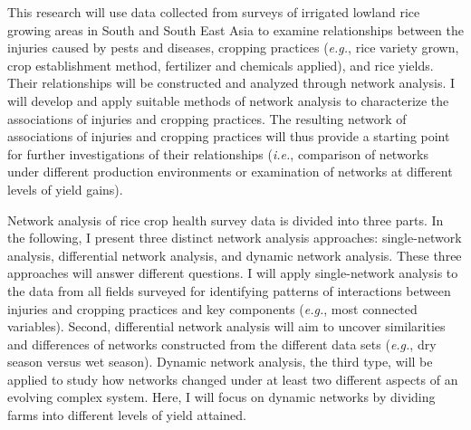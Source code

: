 


This research will use data collected from surveys of irrigated lowland rice growing areas in South and South East Asia to examine relationships between the injuries caused by pests and diseases, cropping practices (\textit{\textit{e.g.}}, rice variety grown, crop establishment method, fertilizer and chemicals applied), and rice yields. Their relationships will be constructed and analyzed through network analysis. I will develop and apply suitable methods of network analysis to characterize the associations of injuries and cropping practices. The resulting network of associations of injuries and cropping practices will thus provide a starting point for further investigations of their relationships (\textit{i.e.}, comparison of networks under different production environments or examination of networks at different levels of yield gains). 

Network analysis of rice crop health survey data is divided into three parts. In the following, I present three distinct network analysis approaches: single-network analysis, differential network analysis, and dynamic network analysis. These three approaches will answer different questions. I will apply single-network analysis to the data from all fields surveyed for identifying patterns of interactions between injuries and cropping practices and key components (\textit{e.g.}, most connected variables). Second, differential network analysis will aim to uncover similarities and differences of networks constructed from the different data sets (\textit{e.g.}, dry season versus wet season). Dynamic network analysis, the third type, will be applied to study how networks changed under at least two different aspects of an evolving complex system. Here, I will focus on dynamic networks by dividing farms into different levels of yield attained. 

